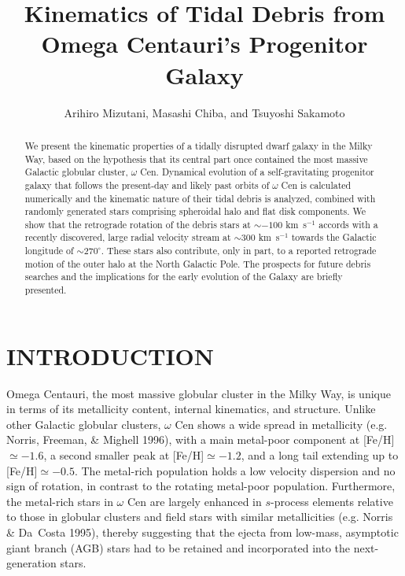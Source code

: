 \documentclass[preprint,12pt]{aastex}
\begin{document}
\title{Kinematics of Tidal Debris from Omega Centauri's
       Progenitor Galaxy}

\author{Arihiro Mizutani,
        Masashi Chiba,
    and Tsuyoshi Sakamoto}


\begin{abstract}
We present the kinematic properties of a tidally disrupted dwarf galaxy in the
Milky Way, based on the hypothesis that its central part once contained the
most massive Galactic globular cluster, $\omega$ Cen. Dynamical evolution of
a self-gravitating progenitor galaxy that follows the present-day and likely
past orbits of $\omega$ Cen is calculated numerically and the kinematic nature
of their tidal debris is analyzed, combined with randomly generated stars
comprising spheroidal halo and flat disk components. We show that the retrograde
rotation of the debris stars at $\sim -100$ km~s$^{-1}$ accords with a recently
discovered, large radial velocity stream at $\sim 300$ km~s$^{-1}$ towards the
Galactic longitude of $\sim 270^\circ$. These stars also contribute, only in
part, to a reported retrograde motion of the outer halo at the North Galactic
Pole. The prospects for future debris searches and the implications for the
early evolution of the Galaxy are briefly presented.
\end{abstract}


\section{INTRODUCTION}

Omega Centauri, the most massive globular cluster in the Milky Way,
is unique in terms of its metallicity content, internal kinematics, and
structure. Unlike other Galactic globular clusters, $\omega$ Cen shows
a wide spread in metallicity (e.g. Norris, Freeman,
\& Mighell 1996), with a main metal-poor component at [Fe/H]$\simeq -1.6$,
a second smaller peak at [Fe/H]$\simeq -1.2$, and a long tail extending
up to [Fe/H]$\simeq -0.5$. The metal-rich population holds
a low velocity dispersion and no sign of rotation, in contrast to the rotating
metal-poor population.
Furthermore, the metal-rich stars in $\omega$ Cen are largely enhanced
in $s$-process elements relative to those in globular clusters and
field stars with similar metallicities (e.g. Norris \& Da~Costa 1995),
thereby suggesting that the ejecta from low-mass,
asymptotic giant branch (AGB) stars had to be retained and incorporated
into the next-generation stars.
\end{document}
